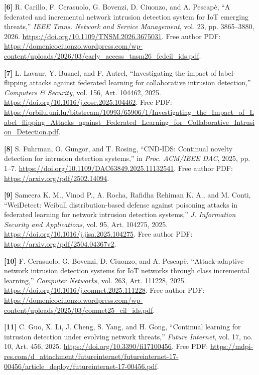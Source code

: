 \documentclass[10pt,a4paper]{article}
\begin{document}
\par\noindent\textbf{[6]}  R. Carillo, F. Cerasuolo, G. Bovenzi, D. Ciuonzo, and A. Pescap\`e, ``A federated and incremental network intrusion detection system for IoT emerging threats,'' \emph{IEEE Trans. Network and Service Management}, vol. 23, pp. 3865--3880, 2026. \url{https://doi.org/10.1109/TNSM.2026.3675031}. Free author PDF: \url{https://domenicociuonzo.wordpress.com/wp-content/uploads/2026/03/early_access_tnsm26_fedcil_ids.pdf}.

\par\noindent\textbf{[7]}  L. Lavaur, Y. Busnel, and F. Autrel, ``Investigating the impact of label-flipping attacks against federated learning for collaborative intrusion detection,'' \emph{Computers \& Security}, vol. 156, Art. 104462, 2025. \url{https://doi.org/10.1016/j.cose.2025.104462}. Free PDF: \url{https://orbilu.uni.lu/bitstream/10993/65906/1/Investigating_the_Impact_of_Label_flipping_Attacks_against_Federated_Learning_for_Collaborative_Intrusion_Detection.pdf}.

\par\noindent\textbf{[8]}  S. Fuhrman, O. Gungor, and T. Rosing, ``CND-IDS: Continual novelty detection for intrusion detection systems,'' in \emph{Proc. ACM/IEEE DAC}, 2025, pp. 1--7. \url{https://doi.org/10.1109/DAC63849.2025.11132541}. Free author PDF: \url{https://arxiv.org/pdf/2502.14094}.

\par\noindent\textbf{[9]}  Sameera K. M., Vinod P., A. Rocha, Rafidha Rehiman K. A., and M. Conti, ``WeiDetect: Weibull distribution-based defense against poisoning attacks in federated learning for network intrusion detection systems,'' \emph{J. Information Security and Applications}, vol. 95, Art. 104275, 2025. \url{https://doi.org/10.1016/j.jisa.2025.104275}. Free author PDF: \url{https://arxiv.org/pdf/2504.04367v2}.

\par\noindent\textbf{[10]}  F. Cerasuolo, G. Bovenzi, D. Ciuonzo, and A. Pescap\`e, ``Attack-adaptive network intrusion detection systems for IoT networks through class incremental learning,'' \emph{Computer Networks}, vol. 263, Art. 111228, 2025. \url{https://doi.org/10.1016/j.comnet.2025.111228}. Free author PDF: \url{https://domenicociuonzo.wordpress.com/wp-content/uploads/2025/03/comnet25_cil_ids.pdf}.

\par\noindent\textbf{[11]}  C. Guo, X. Li, J. Cheng, S. Yang, and H. Gong, ``Continual learning for intrusion detection under evolving network threats,'' \emph{Future Internet}, vol. 17, no. 10, Art. 456, 2025. \url{https://doi.org/10.3390/fi17100456}. Free PDF: \url{https://mdpi-res.com/d_attachment/futureinternet/futureinternet-17-00456/article_deploy/futureinternet-17-00456.pdf}.
\end{document}
